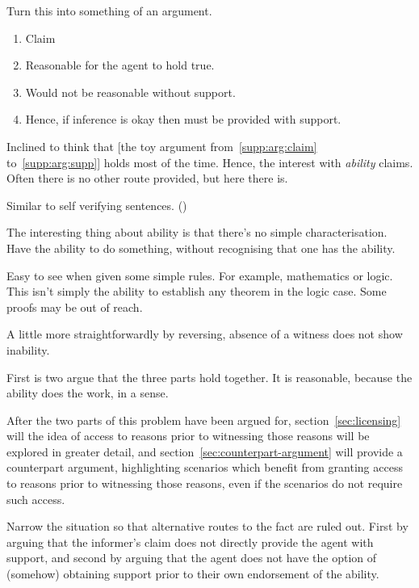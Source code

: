 \documentclass[10pt]{article}
\begin{document}
\begin{note}
  Turn this into something of an argument.
  \begin{enumerate}
  \item\label{supp:arg:claim} Claim
  \item\label{supp:arg:reasonable} Reasonable for the agent to hold true.
  \item\label{supp:arg:need-supp} Would not be reasonable without support.
  \item\label{supp:arg:supp} Hence, if inference is okay then must be provided with support.
  \end{enumerate}
  Inclined to think that [the toy argument from~\ref{supp:arg:claim} to~\ref{supp:arg:supp}] holds most of the time.
Hence, the interest with \emph{ability} claims.
Often there is no other route provided, but here there is.

Similar to self verifying sentences.
(\cite{Burge:1988vn})

The interesting thing about ability is that there's no simple characterisation.
Have the ability to do something, without recognising that one has the ability.

Easy to see when given some simple rules.
For example, mathematics or logic.
This isn't simply the ability to establish any theorem in the logic case.
Some proofs may be out of reach.

A little more straightforwardly by reversing, absence of a witness does not show inability.
\end{note}

{
  \color{red}
  First is two argue that the three parts hold together.
  It is reasonable, because the ability does the work, in a sense.
}

After the two parts of this problem have been argued for, section~\ref{sec:licensing} will the idea of access to reasons prior to witnessing those reasons will be explored in greater detail, and section~\ref{sec:counterpart-argument} will provide a counterpart argument, highlighting scenarios which benefit from granting access to reasons prior to witnessing those reasons, even if the scenarios do not require such access.


{
  \color{red}
  Narrow the situation so that alternative routes to the fact are ruled out.
  First by arguing that the informer's claim does not directly provide the agent with support, and second by arguing that the agent does not have the option of (somehow) obtaining support prior to their own endorsement of the ability.
}
\end{document}
